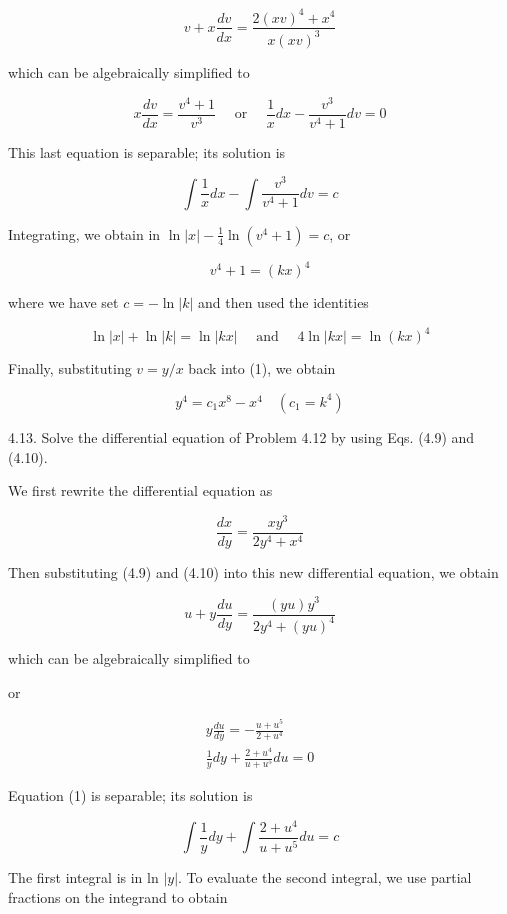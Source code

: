 \documentclass[10pt]{article}
\begin{document}
$$
v+x \frac{d v}{d x}=\frac{2(x v)^{4}+x^{4}}{x(x v)^{3}}
$$

which can be algebraically simplified to

$$
x \frac{d v}{d x}=\frac{v^{4}+1}{v^{3}} \quad \text { or } \quad \frac{1}{x} d x-\frac{v^{3}}{v^{4}+1} d v=0
$$

This last equation is separable; its solution is

$$
\int \frac{1}{x} d x-\int \frac{v^{3}}{v^{4}+1} d v=c
$$

Integrating, we obtain in $\ln |x|-\frac{1}{4} \ln \left(v^{4}+1\right)=c$, or


\begin{equation*}
v^{4}+1=(k x)^{4} \tag{1}
\end{equation*}


where we have set $c=-\ln |k|$ and then used the identities

$$
\ln |x|+\ln |k|=\ln |k x| \quad \text { and } \quad 4 \ln |k x|=\ln (k x)^{4}
$$

Finally, substituting $v=y / x$ back into (1), we obtain


\begin{equation*}
y^{4}=c_{1} x^{8}-x^{4} \quad\left(c_{1}=k^{4}\right) \tag{2}
\end{equation*}


4.13. Solve the differential equation of Problem 4.12 by using Eqs. (4.9) and (4.10).

We first rewrite the differential equation as

$$
\frac{d x}{d y}=\frac{x y^{3}}{2 y^{4}+x^{4}}
$$

Then substituting (4.9) and (4.10) into this new differential equation, we obtain

$$
u+y \frac{d u}{d y}=\frac{(y u) y^{3}}{2 y^{4}+(y u)^{4}}
$$

which can be algebraically simplified to

or


\begin{gather*}
y \frac{d u}{d y}=-\frac{u+u^{5}}{2+u^{4}} \\
\frac{1}{y} d y+\frac{2+u^{4}}{u+u^{5}} d u=0 \tag{1}
\end{gather*}


Equation (1) is separable; its solution is

$$
\int \frac{1}{y} d y+\int \frac{2+u^{4}}{u+u^{5}} d u=c
$$

The first integral is in ln $|y|$. To evaluate the second integral, we use partial fractions on the integrand to obtain
\end{document}
